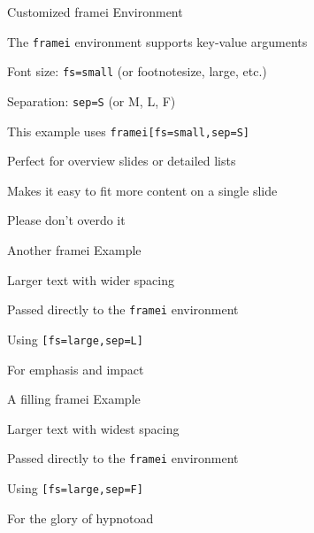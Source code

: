 \documentclass[11pt,compress,t,notes=noshow, xcolor=table]{beamer}
\begin{document}

\begin{framei}[fs=small,sep=S]{Customized framei Environment}
  \item The \texttt{framei} environment supports key-value arguments
  \item Font size: \texttt{fs=small} (or footnotesize, large, etc.)
  \item Separation: \texttt{sep=S} (or M, L, F)
  \item This example uses \texttt{framei[fs=small,sep=S]}
  \item Perfect for overview slides or detailed lists
  \item Makes it easy to fit more content on a single slide
  \item Please don't overdo it
\end{framei}


\begin{framei}[fs=large,sep=L]{Another framei Example}
  \item Larger text with wider spacing
  \item Passed directly to the \texttt{framei} environment
  \item Using \texttt{[fs=large,sep=L]}
  \item For emphasis and impact
\end{framei}


\begin{framei}[fs=large,sep=F]{A filling framei Example}
  \item Larger text with widest spacing
  \item Passed directly to the \texttt{framei} environment
  \item Using \texttt{[fs=large,sep=F]}
  \item For the glory of hypnotoad
\end{framei}

\end{document}
